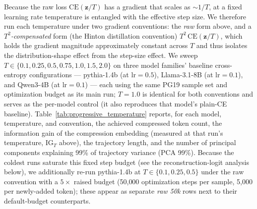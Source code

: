 Because the raw loss $\mathrm{CE}(\mathbf{z}/T)$ has a gradient that scales as ${\sim}1/T$, at a fixed learning rate temperature is entangled with the effective step size. We therefore run each temperature under two gradient conventions: the \emph{raw} form above, and a \emph{$T^2$-compensated} form (the Hinton distillation convention) $T^2\,\mathrm{CE}(\mathbf{z}/T)$, which holds the gradient magnitude approximately constant across $T$ and thus isolates the distribution-shape effect from the step-size effect. We sweep $T \in \{0.1, 0.25, 0.5, 0.75, 1.0, 1.5, 2.0\}$ on three model families' baseline cross-entropy configurations --- pythia-1.4b (at $\mathrm{lr}=0.5$), Llama-3.1-8B (at $\mathrm{lr}=0.1$), and Qwen3-4B (at $\mathrm{lr}=0.1$) --- each using the same PG19 sample set and optimization budget as its main run; $T=1.0$ is identical for both conventions and serves as the per-model control (it also reproduces that model's plain-CE baseline). Table~\ref{tab:progressive_temperature} reports, for each model, temperature, and convention, the achieved compressed token count, the information gain of the compression embedding (measured at that run's temperature, $\mathrm{IG}_T$ above), the trajectory length, and the number of principal components explaining 99\% of trajectory variance (PCA 99\%). Because the coldest runs saturate this fixed step budget (see the reconstruction-logit analysis below), we additionally re-run pythia-1.4b at $T\in\{0.1,0.25,0.5\}$ under the raw convention with a $5\times$ raised budget (50{,}000 optimization steps per sample, 5{,}000 per newly-added token); these appear as separate \emph{raw 50k} rows next to their default-budget counterparts.

